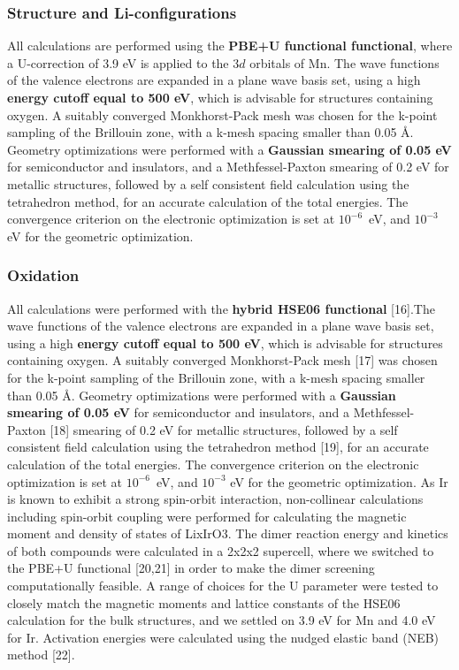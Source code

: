 \begin{refsection}
\subsubsection{Structure and Li-configurations} \label{appendix:sec-structure} 
All calculations are performed using the \textbf{PBE+U functional  
functional}, where a U-correction of 3.9 eV is applied to the $3d$ orbitals of 
Mn. The wave functions of the valence electrons are expanded in a plane wave 
basis set, using a high \textbf{energy cutoff equal to 500 eV}, which is 
advisable for structures containing oxygen. A suitably converged 
Monkhorst-Pack mesh was chosen for the k-point sampling of the Brillouin zone, 
with a k-mesh spacing smaller than 0.05 \AA. Geometry optimizations were 
performed with a \textbf{Gaussian smearing of 0.05 eV} for semiconductor and 
insulators, and a Methfessel-Paxton smearing of 0.2 eV for metallic 
structures, followed by a self consistent field calculation using the 
tetrahedron method, for an accurate calculation of the total energies. The 
convergence criterion on the electronic optimization is set at $10^{-6}$~eV, 
and $10^{-3}$ eV for the geometric optimization. 
 
\subsubsection{Oxidation} \label{appendix:sec-oxidation} 
All calculations were performed with the \textbf{hybrid HSE06 functional} 
[16].The wave functions of the valence electrons are expanded in a plane wave 
basis set, using a high \textbf{energy cutoff equal to 500 eV}, which is 
advisable for structures containing oxygen. A suitably converged 
Monkhorst-Pack mesh [17] was chosen for the k-point sampling of the Brillouin 
zone, with a k-mesh spacing smaller than 0.05 \AA. Geometry optimizations were 
performed with a \textbf{Gaussian smearing of 0.05 eV} for semiconductor and 
insulators, and a Methfessel-Paxton [18] smearing of 0.2 eV for metallic 
structures, followed by a self consistent field calculation using the 
tetrahedron method [19], for an accurate calculation of the total energies. 
The convergence criterion on the electronic optimization is set at 
$10^{-6}$~eV, and $10^{-3}$ eV for the geometric optimization. As Ir is known 
to exhibit a strong spin-orbit interaction, non-collinear calculations 
including spin-orbit coupling were performed for calculating the magnetic 
moment and density of states of LixIrO3. The dimer reaction energy and 
kinetics of both compounds were calculated in a 2x2x2 supercell, where we 
switched to the PBE+U functional [20,21] in order to make the dimer screening 
computationally feasible. A range of choices for the U parameter were tested 
to closely match the magnetic moments and lattice constants of the HSE06 
calculation for the bulk structures, and we settled on 3.9 eV for Mn and 4.0 
eV for Ir. Activation energies were calculated using the nudged elastic band 
(NEB) method [22].  
 

\end{refsection}
